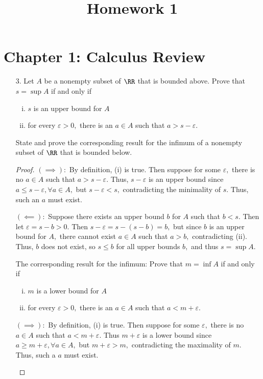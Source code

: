 \documentclass{article}
\begin{document}
\title{Homework 1}
\maketitle
\thispagestyle{fancy}

\section*{Chapter 1: Calculus Review}

\begin{itemize}
	\item[3.] Let $A$ be a nonempty subset of $\RR$ that is bounded above. Prove that $s=\sup A$ if and only if
		\begin{enumerate}[(i)]
			\item $s$ is an upper bound for $A$
			\item for every $\varepsilon>0,$ there is an $a\in A$ such that $a>s-\varepsilon.$
		\end{enumerate}
		State and prove the corresponding result for the infimum of a nonempty subset of $\RR$ that is bounded below.
		\begin{proof}
			$(\implies):$ By definition, (i) is true. Then suppose for some $\varepsilon,$ there is no $a\in A$ such that $a>s-\varepsilon.$ Thus, $s-\varepsilon$ is an upper bound since $a\le s-\varepsilon, \forall a\in A,$ but $s-\varepsilon<s,$ contradicting the minimality of $s.$ Thus, such an $a$ must exist.

			$(\impliedby):$ Suppose there exists an upper bound $b$ for $A$ such that $b<s.$ Then let $\varepsilon=s-b>0.$ Then $s-\varepsilon=s-(s-b)=b,$ but since $b$ is an upper bound for $A,$ there cannot exist $a\in A$ such that $a>b,$ contradicting (ii). Thus, $b$ does not exist, so $s\le b$ for all upper bounds $b,$ and thus $s=\sup A.$

			The corresponding result for the infimum: Prove that $m=\inf A$ if and only if
			\begin{enumerate}[(i)]
				\item $m$ is a lower bound for $A$
				\item for every $\varepsilon>0,$ there is an $a\in A$ such that $a<m+\varepsilon.$
			\end{enumerate}
			\begin{subproof}
				$(\implies):$ By definition, (i) is true. Then suppose for some $\varepsilon,$ there is no $a\in A$ such that $a<m+\varepsilon.$ Thus $m+\varepsilon$ is a lower bound since $a\ge m+\varepsilon, \forall a\in A,$ but $m+\varepsilon>m,$ contradicting the maximality of $m.$ Thus, such a $a$ must exist.	


\end{subproof}
\end{proof}
\end{itemize}
\end{document}
